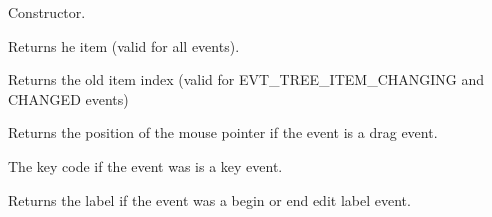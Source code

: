 




Constructor.



Returns he item (valid for all events).



Returns the old item index (valid for EVT\_TREE\_ITEM\_CHANGING and CHANGED events)



Returns the position of the mouse pointer if the event is a drag event.



The key code if the event was is a key event.



Returns the label if the event was a begin or end edit label event.

